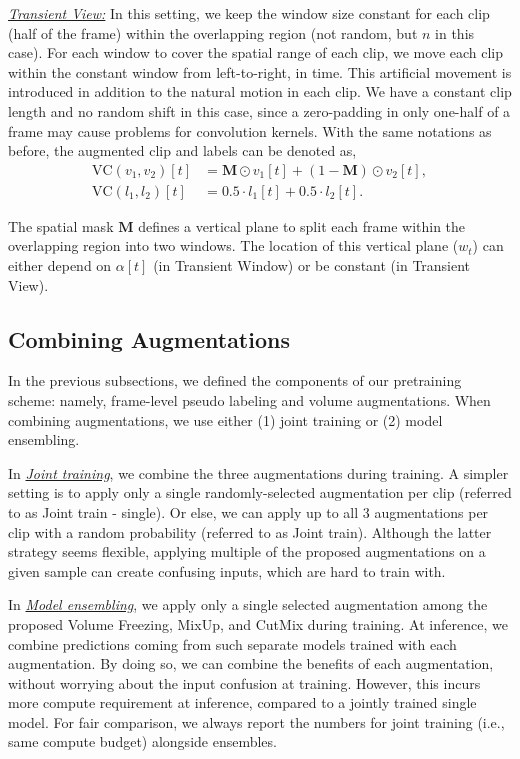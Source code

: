 \documentclass[letterpaper]{article} \usepackage{aaai23}  \usepackage{times}  \usepackage{helvet}  \usepackage{courier}  \usepackage[hyphens]{url}  \usepackage{graphicx} \urlstyle{rm} \def\UrlFont{\rm}  \usepackage{natbib}  \usepackage{caption} \frenchspacing  \setlength{\pdfpagewidth}{8.5in}  \setlength{\pdfpageheight}{11in}  \usepackage{algorithm}
\newcommand{\ch}{}
\begin{document}
\vspace{2mm}
\noindent\textit{\underline{Transient View:}} In this setting, we keep the window size constant for each clip (half of the frame) within the overlapping region (not random, but $n$ in this case). For each window to cover the spatial range of each clip, we move each clip within the constant window from left-to-right, in time. This artificial movement is introduced in addition to the natural motion in each clip. We have a constant clip length and no random shift in this case, since a zero-padding in only one-half of a frame may cause problems for convolution kernels. With the same notations as before, the augmented clip and labels can be denoted as,
{\small
\begin{align*}
    \text{VC}(v_1,v_2)[t] &= \mathbf{M} \odot v_1[t] + (1-\mathbf{M}) \odot v_2[t],\\
    \text{VC}(l_1,l_2)[t] &= 0.5 \cdot l_1[t] + 0.5 \cdot l_2[t].
\end{align*}
}

\ch{The spatial mask $\mathbf{M}$ defines a vertical plane to split each frame within the overlapping region into two windows. The location of this vertical plane ($w_t$) can either depend on $\alpha[t]$ (in Transient Window) or be constant (in Transient View).}



\subsection{Combining Augmentations}
\label{combineAug}

In the previous subsections, we defined the components of our pretraining scheme: namely, frame-level pseudo labeling and volume augmentations. 
When combining augmentations, we use either (1) joint training or (2) model ensembling. 

\vspace{2mm}
\noindent In \textit{\underline{Joint training}}, we combine the three augmentations during training. \ch{A simpler setting is to apply only a single randomly-selected augmentation per clip (referred to as Joint train - single). Or else, we can apply up to all 3 augmentations per clip with a random probability (referred to as Joint train).} Although the latter strategy seems flexible, applying multiple of the proposed augmentations on a given sample can create confusing inputs, which are hard to train with. 

\vspace{2mm}
\noindent In \textit{\underline{Model ensembling}}, we apply only a single selected augmentation among the proposed Volume Freezing, MixUp, and CutMix during training. At inference, we combine predictions coming from such separate models trained with each augmentation. By doing so, we can combine the benefits of each augmentation, without worrying about the input confusion at training. However, this incurs more compute requirement at inference, compared to a jointly trained single model. \ch{For fair comparison, we always report the numbers for joint training (i.e., same compute budget) alongside ensembles.}
\end{document}
